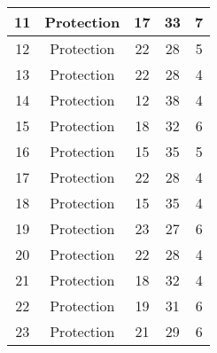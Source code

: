 \documentclass[results.tex]{subfiles}
\begin{document}
\begin{center}
\begin{tabular}{| c || c | c | c | c |}
            \hline
            11                      & Protection                   & 17                     & 33                      & 7                    \\
            \hline
            12                      & Protection                   & 22                     & 28                      & 5                    \\
            \hline
            13                      & Protection                   & 22                     & 28                      & 4                    \\
            \hline
            14                      & Protection                   & 12                     & 38                      & 4                    \\
            \hline
            15                      & Protection                   & 18                     & 32                      & 6                    \\
            \hline
            16                      & Protection                   & 15                     & 35                      & 5                    \\
            \hline
            17                      & Protection                   & 22                     & 28                      & 4                    \\
            \hline
            18                      & Protection                   & 15                     & 35                      & 4                    \\
            \hline
            19                      & Protection                   & 23                     & 27                      & 6                    \\
            \hline
            20                      & Protection                   & 22                     & 28                      & 4                    \\
            \hline
            21                      & Protection                   & 18                     & 32                      & 4                    \\
            \hline
            22                      & Protection                   & 19                     & 31                      & 6                    \\
            \hline
            23                      & Protection                   & 21                     & 29                      & 6                    \\

\end{tabular}
\end{center}
\end{document}
